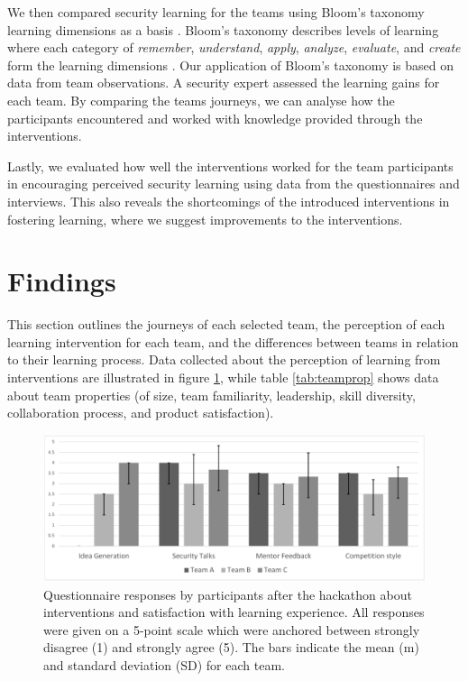 \documentclass[runningheads]{llncs}
\begin{document}
We then compared security learning for the teams using Bloom's taxonomy learning dimensions as a basis \cite{bloom1956taxonomy,krathwohl2009taxonomy}.
Bloom's taxonomy describes levels of learning where each category of \textit{remember}, \textit{understand}, \textit{apply}, \textit{analyze}, \textit{evaluate}, and \textit{create} form the learning dimensions \cite{bloom1956taxonomy,krathwohl2009taxonomy}.
Our application of Bloom's taxonomy is based on data from team observations. A security expert assessed the learning gains for each team. By comparing the teams journeys, we can analyse how the participants encountered and worked with knowledge provided through the interventions.

Lastly, we evaluated how well the interventions worked for the team participants in encouraging perceived security learning using data from the questionnaires and interviews. This also reveals the shortcomings of the introduced interventions in fostering learning, where we suggest improvements to the interventions.

\section{Findings}
This section outlines the journeys of each selected team, the perception of each learning intervention for each team, and the differences between teams in relation to their learning process. Data collected about the perception of learning from interventions are illustrated in figure \ref{Fig:interventionsurvey}, while table \ref{tab:teamprop} shows data about team properties (of size, team familiarity, leadership, skill diversity, collaboration process, and product satisfaction).

\begin{figure}[h]
  \centering
  \includegraphics[width=1\linewidth]{interventionsurvey.pdf}
  \caption{Questionnaire responses by participants after the hackathon about interventions and satisfaction with learning experience. All responses were given on a 5-point scale which were anchored between strongly disagree (1) and strongly agree (5). The bars indicate the mean (m) and standard deviation (SD) for each team.} \label{Fig:interventionsurvey} 
\end{figure}
\end{document}
